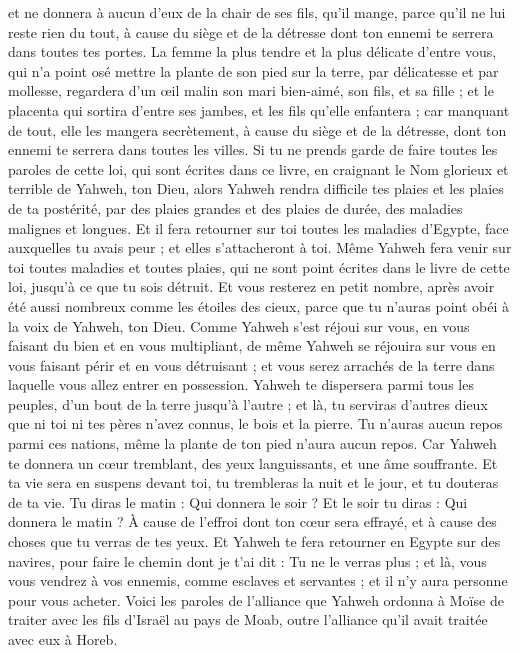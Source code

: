 \begin{multicols}{2}
et ne donnera à aucun d'eux de la chair de ses fils, qu’il mange, parce qu'il ne lui reste rien du tout, à cause du siège et de la détresse dont ton ennemi te serrera dans toutes tes portes.
La femme la plus tendre et la plus délicate d'entre vous, qui n'a point osé mettre la plante de son pied sur la terre, par délicatesse et par mollesse, regardera d'un œil malin son mari bien-aimé, son fils, et sa fille ;
et le placenta qui sortira d'entre ses jambes, et les fils qu'elle enfantera ; car manquant de tout, elle les mangera secrètement, à cause du siège et de la détresse, dont ton ennemi te serrera dans toutes les villes.
Si tu ne prends garde de faire toutes les paroles de cette loi, qui sont écrites dans ce livre, en craignant le Nom glorieux et terrible de Yahweh, ton Dieu,
alors Yahweh rendra difficile tes plaies et les plaies de ta postérité, par des plaies grandes et des plaies de durée, des maladies malignes et longues.
Et il fera retourner sur toi toutes les maladies d'Egypte, face auxquelles tu avais peur ; et elles s'attacheront à toi.
Même Yahweh fera venir sur toi toutes maladies et toutes plaies, qui ne sont point écrites dans le livre de cette loi, jusqu'à ce que tu sois détruit.
Et vous resterez en petit nombre, après avoir été aussi nombreux comme les étoiles des cieux, parce que tu n'auras point obéi à la voix de Yahweh, ton Dieu.
Comme Yahweh s'est réjoui sur vous, en vous faisant du bien et en vous multipliant, de même Yahweh se réjouira sur vous en vous faisant périr et en vous détruisant ; et vous serez arrachés de la terre dans laquelle vous allez entrer en possession.
Yahweh te dispersera parmi tous les peuples, d’un bout de la terre jusqu'à l'autre ; et là, tu serviras d'autres dieux que ni toi ni tes pères n'avez connus, le bois et la pierre.
Tu n'auras aucun repos parmi ces nations, même la plante de ton pied n'aura aucun repos. Car Yahweh te donnera un cœur tremblant, des yeux languissants, et une âme souffrante.
Et ta vie sera en suspens devant toi, tu trembleras la nuit et le jour, et tu douteras de ta vie.
Tu diras le matin : Qui donnera le soir ? Et le soir tu diras : Qui donnera le matin ? À cause de l'effroi dont ton cœur sera effrayé, et à cause des choses que tu verras de tes yeux.
Et Yahweh te fera retourner en Egypte sur des navires, pour faire le chemin dont je t'ai dit : Tu ne le verras plus ; et là, vous vous vendrez à vos ennemis, comme esclaves et servantes ; et il n'y aura personne pour vous acheter.
\VerseOne{}Voici les paroles de l'alliance que Yahweh ordonna à Moïse de traiter avec les fils d'Israël au pays de Moab, outre l'alliance qu'il avait traitée avec eux à Horeb.

\end{multicols}
